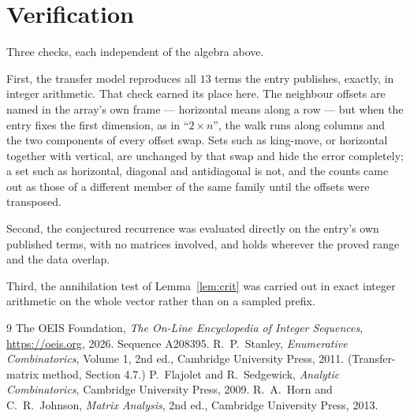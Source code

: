\documentclass[11pt,a4paper]{article}
\theoremstyle{plain}
\theoremstyle{definition}
\begin{document}
\section{Verification}

Three checks, each independent of the algebra above.

First, the transfer model reproduces all $13$ terms the entry publishes, exactly, in
integer arithmetic. That check earned its place here. The neighbour offsets are named in the
array's own frame --- horizontal means along a row --- but when the entry fixes the first
dimension, as in ``$2\times n$'', the walk runs along columns and the two components of every
offset swap. Sets such as king-move, or horizontal together with vertical, are unchanged by
that swap and hide the error completely; a set such as horizontal, diagonal and antidiagonal
is not, and the counts came out as those of a different member of the same family until the
offsets were transposed.

Second, the conjectured recurrence was evaluated directly on the entry's own published terms,
with no matrices involved, and holds wherever the proved range and the data overlap.

Third, the annihilation test of Lemma~\ref{lem:crit} was carried out in exact integer
arithmetic on the whole vector rather than on a sampled prefix.

\begin{thebibliography}{9}
 The OEIS Foundation, \emph{The On-Line Encyclopedia of Integer
Sequences}, \url{https://oeis.org}, 2026. Sequence A208395.
 R.~P.~Stanley, \emph{Enumerative Combinatorics}, Volume 1, 2nd ed.,
Cambridge University Press, 2011. (Transfer-matrix method, Section 4.7.)
 P.~Flajolet and R.~Sedgewick, \emph{Analytic Combinatorics}, Cambridge
University Press, 2009.
 R.~A.~Horn and C.~R.~Johnson, \emph{Matrix Analysis}, 2nd ed., Cambridge
University Press, 2013.
\end{thebibliography}
\end{document}
